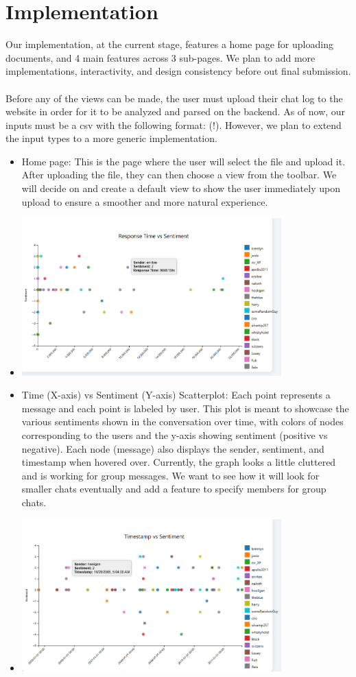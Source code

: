 \documentclass{article}\usepackage{graphicx}
\begin{document}
\section*{Implementation}
Our implementation, at the current stage, features a home page for uploading documents, and 4 main features across 3 sub-pages. We plan to add more implementations, interactivity, and design consistency before out final submission.
\\\\
Before any of the views can be made, the user must upload their chat log to the website in order for it to be analyzed and parsed on the backend. As of now, our inputs must be a csv with the following format: (!). However, we plan to extend the input types to a more generic implementation.
\begin{itemize}
    \item Home page: This is the page where the user will select the file and upload it. After uploading the file, they can then choose a view from the toolbar. We will decide on and create a default view to show the user immediately upon upload to ensure a smoother and more natural experience. 
    \item \includegraphics[width=10cm]{./Latex Images/Responsetime timeline ss.png}
    \item Time (X-axis) vs Sentiment (Y-axis) Scatterplot: Each point represents a message and each point is labeled by user. This plot is meant to showcase the various sentiments shown in the conversation over time, with colors of nodes corresponding to the users and the y-axis showing sentiment (positive vs negative). Each node (message) also displays the sender, sentiment, and timestamp when hovered over. Currently, the graph looks a little cluttered and is working for group messages. We want to see how it will look for smaller chats eventually and add a feature to specify members for group chats.
    \item \includegraphics[width=10cm]{./Latex Images/Timeline Sentiment ss.png}

\end{itemize}
\end{document}
